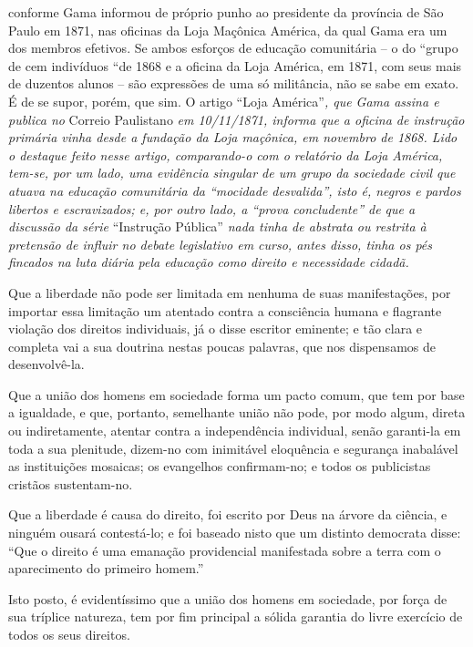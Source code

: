 \begin{didascalia}
{conforme Gama informou de próprio punho ao presidente da província de
São Paulo em 1871, nas oficinas da Loja Maçônica América, da qual Gama
era um dos membros efetivos. Se ambos esforços de educação comunitária
-- o do ``grupo de cem indivíduos ``de 1868 e a oficina da Loja América,
em 1871, com seus mais de duzentos alunos -- são expressões de uma só
militância, não se sabe em exato. É de se supor, porém, que sim. O
artigo} ``Loja América''\emph{, que Gama assina e publica no} Correio
Paulistano \emph{em 10/11/1871, informa que a oficina de instrução
primária vinha desde a fundação da Loja maçônica, em novembro de 1868.
Lido o destaque feito nesse artigo, comparando-o com o relatório da Loja
América, tem-se, por um lado, uma evidência singular de um grupo da
sociedade civil que atuava na educação comunitária da ``mocidade
desvalida'', isto é, negros e pardos libertos e escravizados; e, por
outro lado, a ``prova concludente'' de que a discussão da série}
``Instrução Pública'' \emph{nada tinha de abstrata ou restrita à pretensão
de influir no debate legislativo em curso, antes disso, tinha os pés
fincados na luta diária pela educação como direito e necessidade
cidadã.}
\end{didascalia}

\asterisc{}

Que a liberdade não pode ser limitada em nenhuma de suas manifestações,
por importar essa limitação um atentado contra a consciência humana e
flagrante violação dos direitos individuais, já o disse escritor
eminente; e tão clara e completa vai a sua doutrina nestas poucas
palavras, que nos dispensamos de desenvolvê-la.

Que a união dos homens em sociedade forma um pacto comum, que tem por
base a igualdade, e que, portanto, semelhante união não pode, por modo
algum, direta ou indiretamente, atentar contra a independência
individual, senão garanti-la em toda a sua plenitude, dizem-no com
inimitável eloquência e segurança inabalável as instituições mosaicas;
os evangelhos confirmam-no; e todos os publicistas cristãos
sustentam-no.

Que a liberdade é causa do direito, foi escrito por Deus na árvore da
ciência, e ninguém ousará contestá-lo; e foi baseado nisto que um
distinto democrata disse: ``Que o direito é uma emanação providencial
manifestada sobre a terra com o aparecimento do primeiro homem.''

Isto posto, é evidentíssimo que a união dos homens em sociedade, por
força de sua tríplice natureza, tem por fim principal a sólida garantia
do livre exercício de todos os seus direitos.

